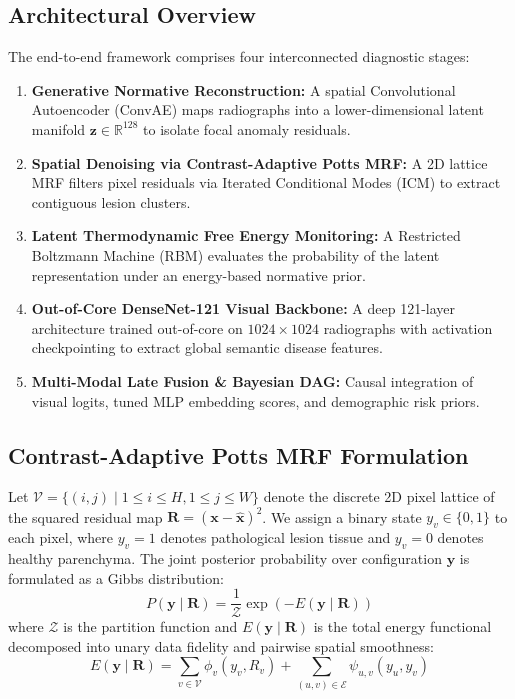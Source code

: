 \documentclass[conference]{IEEEtran}
\begin{document}
\subsection{Architectural Overview}
The end-to-end framework comprises four interconnected diagnostic stages:
\begin{enumerate}
    \item \textbf{Generative Normative Reconstruction:} A spatial Convolutional Autoencoder (ConvAE) maps radiographs into a lower-dimensional latent manifold $\mathbf{z} \in \mathbb{R}^{128}$ to isolate focal anomaly residuals.
    \item \textbf{Spatial Denoising via Contrast-Adaptive Potts MRF:} A 2D lattice MRF filters pixel residuals via Iterated Conditional Modes (ICM) to extract contiguous lesion clusters.
    \item \textbf{Latent Thermodynamic Free Energy Monitoring:} A Restricted Boltzmann Machine (RBM) evaluates the probability of the latent representation under an energy-based normative prior.
    \item \textbf{Out-of-Core DenseNet-121 Visual Backbone:} A deep 121-layer architecture trained out-of-core on $1024 \times 1024$ radiographs with activation checkpointing to extract global semantic disease features.
    \item \textbf{Multi-Modal Late Fusion \& Bayesian DAG:} Causal integration of visual logits, tuned MLP embedding scores, and demographic risk priors.
\end{enumerate}

\subsection{Contrast-Adaptive Potts MRF Formulation}
Let $\mathcal{V} = \{(i, j) \mid 1 \le i \le H, 1 \le j \le W\}$ denote the discrete 2D pixel lattice of the squared residual map $\mathbf{R} = (\mathbf{x} - \hat{\mathbf{x}})^2$. We assign a binary state $y_v \in \{0, 1\}$ to each pixel, where $y_v = 1$ denotes pathological lesion tissue and $y_v = 0$ denotes healthy parenchyma. The joint posterior probability over configuration $\mathbf{y}$ is formulated as a Gibbs distribution:
\begin{equation}
P(\mathbf{y} \mid \mathbf{R}) = \frac{1}{\mathcal{Z}} \exp(-E(\mathbf{y} \mid \mathbf{R}))
\end{equation}
where $\mathcal{Z}$ is the partition function and $E(\mathbf{y} \mid \mathbf{R})$ is the total energy functional decomposed into unary data fidelity and pairwise spatial smoothness:
\begin{equation}
E(\mathbf{y} \mid \mathbf{R}) = \sum_{v \in \mathcal{V}} \phi_v(y_v, R_v) + \sum_{(u, v) \in \mathcal{E}} \psi_{u, v}(y_u, y_v)
\end{equation}
\end{document}

